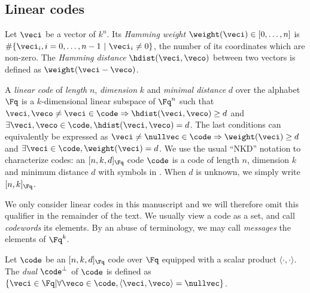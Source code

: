

\subsection{Linear codes}

\begin{defi}
Let $\veci$ be a vector of $k^n$. Its \emph{Hamming weight} $\weight(\veci) \in [0,\ldots,n]$ is $\#\{\veci_i, i = 0,\ldots,n-1~|~ \veci_i \neq 0\}$,
the number of its coordinates which are non-zero.
The \emph{Hamming distance} $\hdist(\veci,\veco)$ between two vectors is defined as $\weight(\veci - \veco)$.
\end{defi}


\begin{defi}
\label{def:lincode}
A \emph{linear code} of \emph{length} $n$, \emph{dimension} $k$ and \emph{minimal distance} $d$ over the alphabet $\Fq$ is a $k$-dimensional linear subspace of $\Fq^n$ such that
$\veci, \veco \neq \veci \in \code \Rightarrow \hdist(\veci, \veco) \geq d$
and $\exists \veci, \veco \in \code,  \hdist(\veci, \veco) = d$.
The last conditions can equivalently be expressed as $\veci \neq \nullvec \in \code \Rightarrow \weight(\veci) \geq d$ and $\exists \veci \in \code, \weight(\veci) = d$.
We use the usual ``NKD'' notation to characterize codes: an $[n, k, d]_{\Fq}$ code $\code$ is a code of length $n$, dimension $k$ and minimum distance $d$
with symbols in \Fq. When $d$ is unknown, we simply write $[n, k]_{\Fq}$.
\end{defi}

We only consider linear codes in this manuscript and we will therefore omit this qualifier in the remainder of the text. 
We usually view a code as a set, and call \emph{codewords} its elements. By an abuse of terminology, we may call \emph{messages} the elements of $\Fq^k$.

\begin{defi}
Let $\code$ be an $[n, k, d]_{\Fq}$ code over $\Fq$ equipped with a scalar product $\langle\cdot,\cdot\rangle$. The \emph{dual}
$\code^\bot$ of $\code$ is defined as $\{\veci \in \Fq | \forall \veco \in \code, \langle\veci,\veco\rangle = \nullvec\}$.
\end{defi}

